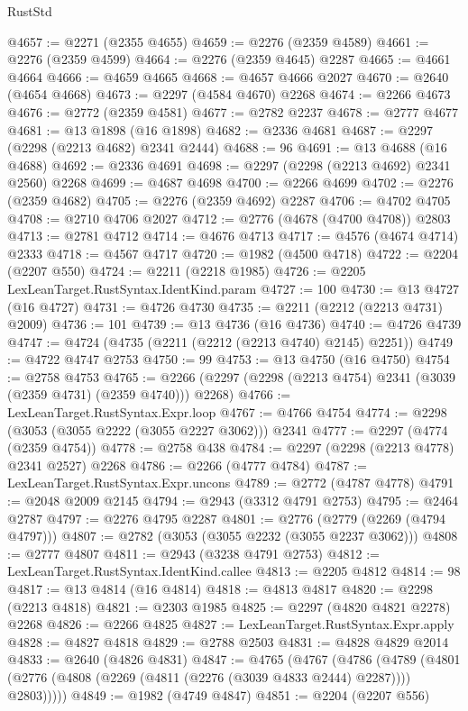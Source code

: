\begin{lexlean}{RustStd}
\begin{coremodule}
@4657 := @2271 (@2355 @4655)
@4659 := @2276 (@2359 @4589)
@4661 := @2276 (@2359 @4599)
@4664 := @2276 (@2359 @4645) @2287
@4665 := @4661 @4664
@4666 := @4659 @4665
@4668 := @4657 @4666 @2027
@4670 := @2640 (@4654 @4668)
@4673 := @2297 (@4584 @4670) @2268
@4674 := @2266 @4673
@4676 := @2772 (@2359 @4581)
@4677 := @2782 @2237
@4678 := @2777 @4677
@4681 := @13 @1898 (@16 @1898)
@4682 := @2336 @4681
@4687 := @2297 (@2298 (@2213 @4682) @2341 @2444)
@4688 := 96
@4691 := @13 @4688 (@16 @4688)
@4692 := @2336 @4691
@4698 := @2297 (@2298 (@2213 @4692) @2341 @2560) @2268
@4699 := @4687 @4698
@4700 := @2266 @4699
@4702 := @2276 (@2359 @4682)
@4705 := @2276 (@2359 @4692) @2287
@4706 := @4702 @4705
@4708 := @2710 @4706 @2027
@4712 := @2776 (@4678 (@4700 @4708)) @2803
@4713 := @2781 @4712
@4714 := @4676 @4713
@4717 := @4576 (@4674 @4714) @2333
@4718 := @4567 @4717
@4720 := @1982 (@4500 @4718)
@4722 := @2204 (@2207 @550)
@4724 := @2211 (@2218 @1985)
@4726 := @2205 LexLeanTarget.RustSyntax.IdentKind.param
@4727 := 100
@4730 := @13 @4727 (@16 @4727)
@4731 := @4726 @4730
@4735 := @2211 (@2212 (@2213 @4731) @2009)
@4736 := 101
@4739 := @13 @4736 (@16 @4736)
@4740 := @4726 @4739
@4747 := @4724 (@4735 (@2211 (@2212 (@2213 @4740) @2145) @2251))
@4749 := @4722 @4747 @2753
@4750 := 99
@4753 := @13 @4750 (@16 @4750)
@4754 := @2758 @4753
@4765 := @2266 (@2297 (@2298 (@2213 @4754) @2341 (@3039 (@2359 @4731) (@2359 @4740))) @2268)
@4766 := LexLeanTarget.RustSyntax.Expr.loop
@4767 := @4766 @4754
@4774 := @2298 (@3053 (@3055 @2222 (@3055 @2227 @3062))) @2341
@4777 := @2297 (@4774 (@2359 @4754))
@4778 := @2758 @438
@4784 := @2297 (@2298 (@2213 @4778) @2341 @2527) @2268
@4786 := @2266 (@4777 @4784)
@4787 := LexLeanTarget.RustSyntax.Expr.uncons
@4789 := @2772 (@4787 @4778)
@4791 := @2048 @2009 @2145
@4794 := @2943 (@3312 @4791 @2753)
@4795 := @2464 @2787
@4797 := @2276 @4795 @2287
@4801 := @2776 (@2779 (@2269 (@4794 @4797)))
@4807 := @2782 (@3053 (@3055 @2232 (@3055 @2237 @3062)))
@4808 := @2777 @4807
@4811 := @2943 (@3238 @4791 @2753)
@4812 := LexLeanTarget.RustSyntax.IdentKind.callee
@4813 := @2205 @4812
@4814 := 98
@4817 := @13 @4814 (@16 @4814)
@4818 := @4813 @4817
@4820 := @2298 (@2213 @4818)
@4821 := @2303 @1985
@4825 := @2297 (@4820 @4821 @2278) @2268
@4826 := @2266 @4825
@4827 := LexLeanTarget.RustSyntax.Expr.apply
@4828 := @4827 @4818
@4829 := @2788 @2503
@4831 := @4828 @4829 @2014
@4833 := @2640 (@4826 @4831)
@4847 := @4765
    (@4767
      (@4786
        (@4789 (@4801 (@2776 (@4808 (@2269 (@4811 (@2276 (@3039 @4833 @2444) @2287)))) @2803)))))
@4849 := @1982 (@4749 @4847)
@4851 := @2204 (@2207 @556)

\end{coremodule}
\end{lexlean}
